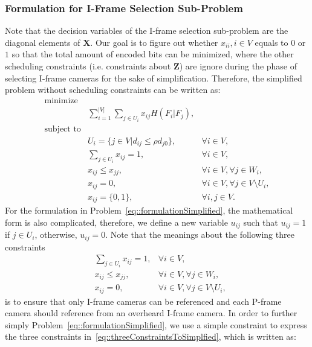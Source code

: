 \subsubsection{Formulation for I-Frame Selection Sub-Problem}
\label{sec::iFrameSelectionSubProbFormulation}
Note that the decision variables of the I-frame selection sub-problem are the diagonal elements of $\mathbf{X}$.
Our goal is to figure out whether ${x_{ii},i \in V}$ equals to $0$ or $1$ so that the total amount of encoded bits can be minimized, where the other scheduling constraints (i.e. constraints about $\mathbf{Z}$) are ignore during the phase of selecting I-frame cameras for the sake of simplification.
Therefore, the simplified problem without scheduling constraints can be written as:
\begin{align}
\text{minimize} & & \nonumber \\
	&\sum_{i=1}^{|V|} \sum_{j \in U_i}  x_{ij} H(F_i|F_j), & \nonumber \\
\text{subject to} & & \nonumber \\
	&U_i = \{ j \in V | d_{ij} \leq \rho d_{j0} \}, &\forall i \in V, \nonumber \\
	&\sum_{j \in U_i} x_{ij} = 1, &\forall i \in V, \nonumber \\
	&x_{ij} \leq x_{jj}, &\forall i \in V, \forall j \in W_i, \nonumber \\
	&x_{ij} = 0, &\forall i \in V, \forall j \in V \setminus U_i, \nonumber \\
	&x_{ij} = \{0,1\}, &\forall i,j \in V.
\label{eq::formulationSimplified}
\end{align}
For the formulation in Problem~\eqref{eq::formulationSimplified}, the mathematical form is also complicated, therefore, we define a new variable $u_{ij}$ such that $u_{ij} = 1$ if $j \in U_i$, otherwise, $u_{ij} = 0$.
Note that the meanings about the following three constraints
\begin{align}
&\sum_{j \in U_i} x_{ij} = 1, &\forall i \in V, \nonumber \\
&x_{ij} \leq x_{jj}, &\forall i \in V, \forall j \in W_i, \nonumber \\
&x_{ij} = 0, &\forall i \in V, \forall j \in V \setminus U_i,
\label{eq::threeConstraintsToSimplfied}
\end{align}
is to ensure that only I-frame cameras can be referenced and each P-frame camera should reference from an overheard I-frame camera.
In order to further simply Problem~\eqref{eq::formulationSimplified}, we use a simple constraint to express the three constraints in~\eqref{eq::threeConstraintsToSimplfied}, which is written as:
